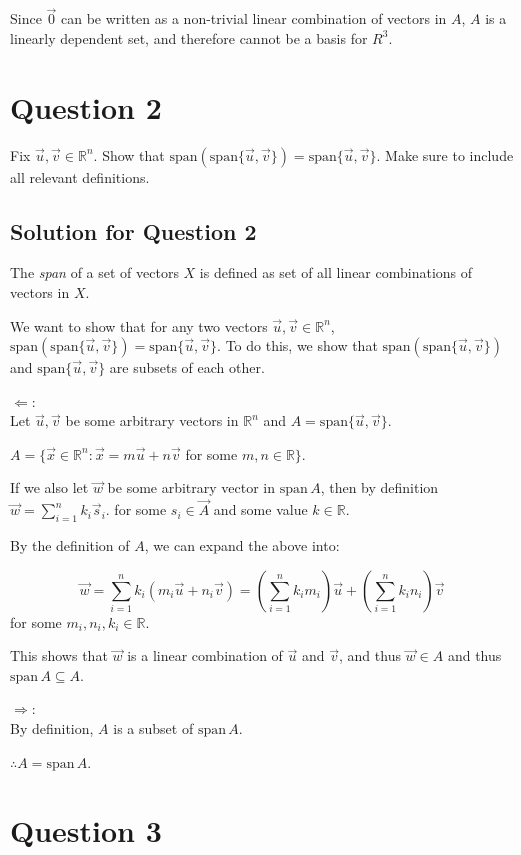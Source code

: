 \documentclass[letter]{article}
\newcommand{\R}{\mathbb{R}}
\newcommand{\Span}{\mathrm{span}}
\begin{document}
Since $\vec 0$ can be written as a non-trivial linear combination of vectors in $A$, $A$ is a linearly dependent set, and therefore cannot be a basis for $R^3$.

\section{Question 2}

Fix $\vec u,\vec v\in \R^n$.  Show that $\Span(\Span\{\vec u,\vec v\})=\Span\{\vec u,\vec v\}$.
      Make sure to include all relevant definitions.

\subsection{Solution for Question 2}

    The \emph{span} of a set of vectors $X$ is defined as set of all linear combinations of vectors in $X$.

    We want to show that for any two vectors $\vec u,\vec v\in \R^n$,
        $\Span(\Span\{\vec u,\vec v\})=\Span\{\vec u,\vec v\}$. To do this, we show that $\Span(\Span\{\vec u,\vec v\})$ and $\Span\{\vec u,\vec v\}$ are subsets of each other.

    $\Leftarrow$:\\
    Let $\vec u,\vec v$ be some arbitrary vectors in $\R^n$ and $A=\Span\{\vec u,\vec v\}$.

  $A=\{\vec x\in\R^n:\vec x=m\vec u+n\vec v$ for some $m,n\in \R\}$.

    If we also let $\vec w$ be some arbitrary vector in $\Span\,A$, then by definition
    $\vec w=\sum_{i=1}^n k_i\vec s_i$. for some $s_i \in \vec A$ and some value $k \in \R$.

    By the definition of $A$, we can expand the above into:

    \[
        \vec w =\sum_{i=1}^n k_i (m_i\vec u+n_i\vec v)=
        (\sum_{i=1}^n k_i m_i)\vec u+
        (\sum_{i=1}^n k_i n_i)\vec v
    \]
        for some $m_i,n_i,k_i\in \R$.

        This shows that $\vec w$ is a linear combination of $\vec u$ and $\vec v$, and thus $\vec w \in A$
        and thus $\Span\, A\subseteq A$.

    $\Rightarrow$:\\
    By definition, $A$ is a subset of $\Span\,A$.

    $\therefore A=\Span\,A$.

\section{Question 3}
\end{document}
